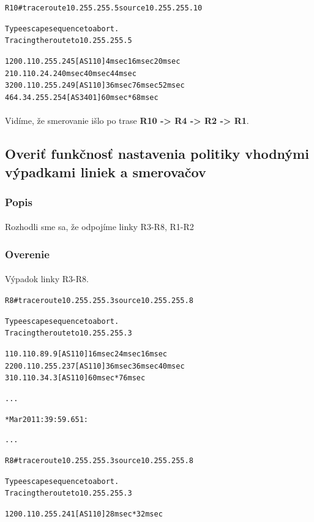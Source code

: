 \documentclass[12pt,twoside,a4paper]{report}
\begin{document}
\noindent
{\selectfont
\begin{small}
\begin{alltt}
R10#traceroute 10.255.255.5 source 10.255.255.10

Type escape sequence to abort.
Tracing the route to 10.255.255.5

  1 200.110.255.245 [AS 110] 4 msec 16 msec 20 msec
  2 10.110.24.2 40 msec 40 msec 44 msec
  3 200.110.255.249 [AS 110] 36 msec 76 msec 52 msec
  4 64.34.255.254 [AS 3401] 60 msec *  68 msec

\end{alltt}
\end{small}
}

\paragraph{}
Vidíme, že smerovanie išlo po trase \textbf{R10 -\textgreater{} R4 -\textgreater{} R2 -\textgreater{} R1}.

\subsection{Overiť funkčnosť nastavenia politiky vhodnými výpadkami liniek a smerovačov}
\subsubsection{Popis}
\paragraph{}
Rozhodli sme sa, že odpojíme linky R3-R8, R1-R2

\subsubsection{Overenie}
\paragraph{}
Výpadok linky R3-R8.

\noindent
{\selectfont
\begin{small}
\begin{alltt}
R8#traceroute 10.255.255.3 source 10.255.255.8

Type escape sequence to abort.
Tracing the route to 10.255.255.3

  1 10.110.89.9 [AS 110] 16 msec 24 msec 16 msec
  2 200.110.255.237 [AS 110] 36 msec 36 msec 40 msec
  3 10.110.34.3 [AS 110] 60 msec *  76 msec

...

*Mar 20 11:39:59.651: %

...

R8#traceroute 10.255.255.3 source 10.255.255.8

Type escape sequence to abort.
Tracing the route to 10.255.255.3

  1 200.110.255.241 [AS 110] 28 msec *  32 msec
\end{alltt}
\end{small}
}
\end{document}
